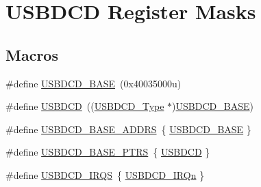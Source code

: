 \hypertarget{group___u_s_b_d_c_d___register___masks}{}\section{U\+S\+B\+D\+CD Register Masks}
\label{group___u_s_b_d_c_d___register___masks}
\subsection*{Macros}
\begin{DoxyCompactItemize}
\item 
\#define \mbox{\hyperlink{group___u_s_b_d_c_d___register___masks_ga56567d124166bfc332eefcbeb3c8bfb7}{U\+S\+B\+D\+C\+D\+\_\+\+B\+A\+SE}}~(0x40035000u)
\item 
\#define \mbox{\hyperlink{group___u_s_b_d_c_d___register___masks_gacd05c07582eca3f464f8c7436ed56ec1}{U\+S\+B\+D\+CD}}~((\mbox{\hyperlink{struct_u_s_b_d_c_d___type}{U\+S\+B\+D\+C\+D\+\_\+\+Type}} $\ast$)\mbox{\hyperlink{group___u_s_b_d_c_d___register___masks_ga56567d124166bfc332eefcbeb3c8bfb7}{U\+S\+B\+D\+C\+D\+\_\+\+B\+A\+SE}})
\item 
\#define \mbox{\hyperlink{group___u_s_b_d_c_d___register___masks_ga025e2ac90159213302b6b5801a3c8d22}{U\+S\+B\+D\+C\+D\+\_\+\+B\+A\+S\+E\+\_\+\+A\+D\+D\+RS}}~\{ \mbox{\hyperlink{group___u_s_b_d_c_d___register___masks_ga56567d124166bfc332eefcbeb3c8bfb7}{U\+S\+B\+D\+C\+D\+\_\+\+B\+A\+SE}} \}
\item 
\#define \mbox{\hyperlink{group___u_s_b_d_c_d___register___masks_ga343ff2427307e24846cef614df7cea8a}{U\+S\+B\+D\+C\+D\+\_\+\+B\+A\+S\+E\+\_\+\+P\+T\+RS}}~\{ \mbox{\hyperlink{group___u_s_b_d_c_d___register___masks_gacd05c07582eca3f464f8c7436ed56ec1}{U\+S\+B\+D\+CD}} \}
\item 
\#define \mbox{\hyperlink{group___u_s_b_d_c_d___register___masks_ga052db5d600e4b53eb3e2ea7ef8281b6e}{U\+S\+B\+D\+C\+D\+\_\+\+I\+R\+QS}}~\{ \mbox{\hyperlink{group___interrupt__vector__numbers_gga666eb0caeb12ec0e281415592ae89083a92a4fa8925ba3e31f873313f577f18a7}{U\+S\+B\+D\+C\+D\+\_\+\+I\+R\+Qn}} \}
\end{DoxyCompactItemize}
